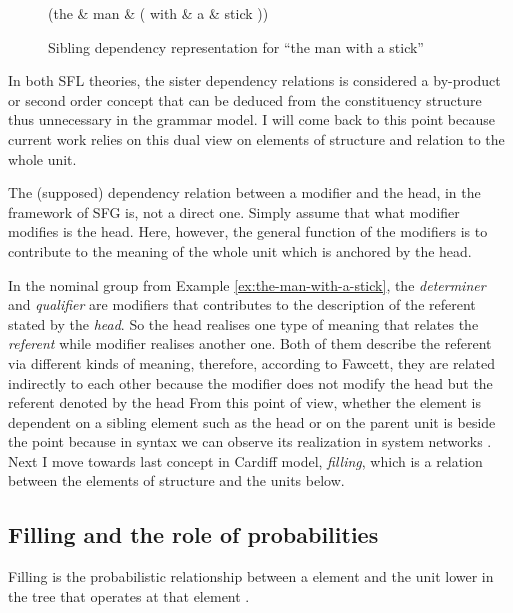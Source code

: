 \begin{figure}[!ht]
    \centering
    \begin{dependency}
        \begin{deptext}[column sep=1em]
            (the \& man \& ( with \& a \& stick )) \\
        \end{deptext}
    \end{dependency}
	\caption{Sibling dependency representation for ``the man with a stick''}
    \label{fig:dep-example-man-with-a-stick}
\end{figure}

In both SFL theories, the sister dependency relations is considered a by-product or second order concept that can be deduced from the constituency structure thus unnecessary in the grammar model. I will come back to this point because current work relies on this dual view on elements of structure and relation to the whole unit. 

The (supposed) dependency relation between a modifier and the head, in the framework of SFG is, not a direct one. 
Simply assume that what modifier modifies is the head. Here, however, the general function of the modifiers is to contribute to the meaning of the whole unit which is anchored by the head. 

In the nominal group from Example \ref{ex:the-man-with-a-stick}, the \textit{determiner} and \textit{qualifier} are modifiers that contributes to the description of the referent stated by the \textit{head}. So the head realises one type of meaning that relates the \textit{referent} while modifier realises another one. Both of them describe the referent via different kinds of meaning, therefore, according to Fawcett, they are related indirectly to each other because the modifier does not modify the head but the referent denoted by the head From this point of view, whether the element is dependent on a sibling element such as the head or on the parent unit is beside the point because in syntax we can observe its realization in system networks \citep[216--217]{Fawcett2000}.
Next I move towards last concept in Cardiff model, \textit{filling}, which is a relation between the elements of structure and the units below.

\subsection{Filling and the role of probabilities}
\begin{definition}[Filling]\label{def:filling}
    Filling is the probabilistic relationship between a element and the unit lower in the tree that operates at that element \citep[238, 251]{Fawcett2000}. 
\end{definition}

